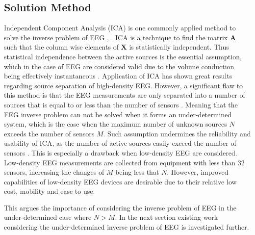 \subsection{Solution Method}\label{sec:ICAsolution}
Independent Component Analysis (ICA) is one commonly applied method to solve the inverse problem of EEG \cite{Scott1996}, \cite{Scott1997}. ICA is a technique to find the matrix $\mathbf{A}$ such that the column wise elements of $\mathbf{X}$ is statistically independent. Thus statistical independence between the active sources is the essential assumption, which in the case of EEG are considered valid due to the volume conduction being effectively instantaneous \cite[p. 3]{Scott1997}. 
Application of ICA has shown great results regarding source separation of high-density EEG. 
However, a significant flaw to this method is that the EEG measurements are only separated into a number of sources that is equal to or less than the number of sensors \cite{Balkan2015}.
Meaning that the EEG inverse problem can not be solved when  it forms an under-determined system, which is the case when the maximum number of unknown sources $N$ exceeds the number of sensors $M$. 
Such assumption undermines the reliability and usability of ICA, as the number of active sources easily exceed the number of sensors \cite{phd2015}. 
This is especially a drawback when low-density EEG are considered. Low-density EEG measurements are collected from equipment with less than 32 sensors, increasing the changes of $M$ being less that $N$. 
However, improved capabilities of low-density EEG devices are desirable due to their relative low cost, mobility and ease to use. 

This argues the importance of considering the inverse problem of EEG in the under-determined case where $N>M$. In the next section existing work considering the under-determined inverse problem of EEG is investigated further. 

